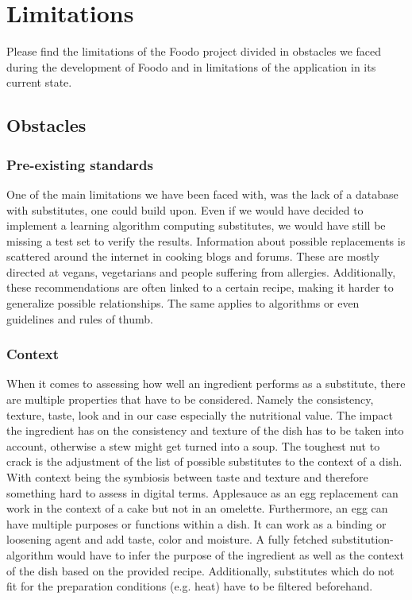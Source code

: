 \chapter{Limitations}

Please find the limitations of the Foodo project divided in obstacles we faced during the development of Foodo and in limitations of the application in its current state.

\section{Obstacles}

\subsection*{Pre-existing standards}
One of the main limitations we have been faced with, was the lack of a database with substitutes, one could build upon. Even if we would have decided to implement a learning algorithm computing substitutes, we would have still be missing a test set to verify the results. Information about possible replacements is scattered around the internet in cooking blogs and forums. These are mostly directed at vegans, vegetarians and people suffering from allergies. Additionally, these recommendations are often linked to a certain recipe, making it harder to generalize possible relationships.
The same applies to algorithms or even guidelines and rules of thumb.

\subsection*{Context}
When it comes to assessing how well an ingredient performs as a substitute, there are multiple properties that have to be considered. Namely the consistency, texture, taste, look and in our case especially the nutritional value. The impact the ingredient has on the consistency and texture of the dish has to be taken into account, otherwise a stew might get turned into a soup. The toughest nut to crack is the adjustment of the list of possible substitutes to the context of a dish. With context being the symbiosis between taste and texture and therefore something hard to assess in digital terms. Applesauce as an egg replacement can work in the context of a cake but not in an omelette. Furthermore, an egg can have multiple purposes or functions within a dish. It can work as a binding or loosening agent and add taste, color and moisture. A fully fetched substitution-algorithm would have to infer the purpose of the ingredient as well as the context of the dish based on the provided recipe. Additionally, substitutes which do not fit for the preparation conditions (e.g. heat) have to be filtered beforehand. 

